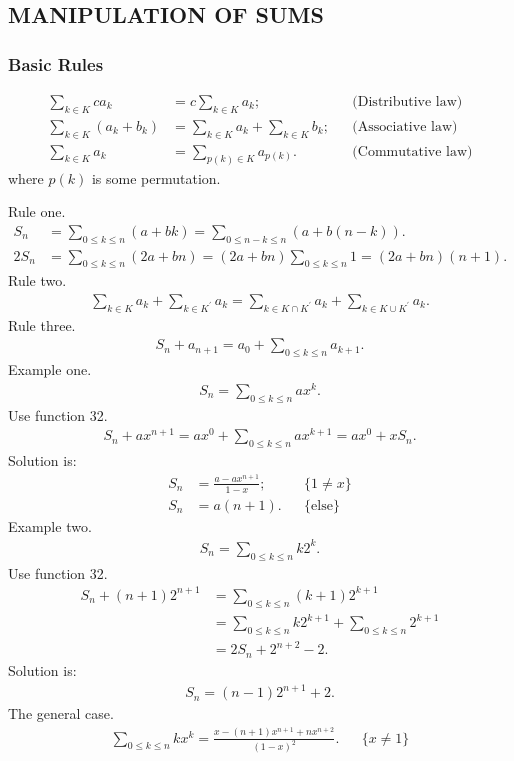 \documentclass{article}
\begin{document}
\subsection{MANIPULATION OF SUMS}
\subsubsection{Basic Rules}

\begin{align}
\sum_{k\in K} ca_k &= c\sum_{k\in K}a_k; && \text{(Distributive law)}\\
\sum_{k\in K} {(a_k+b_k)} &= \sum_{k\in K}a_k + \sum_{k\in K}b_k; && \text{(Associative law)}\\
\sum_{k\in K} a_k &= \sum_{p(k)\in K}a_{p(k)}. && \text{(Commutative law)}
\end{align}
where $p(k)$ is some permutation.


Rule one.
\begin{align}
S_n &= \sum_{0\le k \le n}{(a+bk)} = \sum_{0\le n - k \le n}{(a+b(n-k))}.\\
2S_n &= \sum_{0 \le k \le n} {(2a+bn)} = (2a+bn) \sum_{0 \le k \le n} {1} = (2a+bn)(n+1).
\end{align}
Rule two.
\begin{align}
\sum_{k\in K}{a_k} + \sum_{k\in K^\prime}{a_k} = \sum_{k\in K \cap K^\prime}{a_k} + \sum_{k\in K \cup K^\prime}{a_k}.
\end{align}
Rule three.
\begin{align}
S_n + a_{n+1} = a_0 + \sum_{0\le k \le n}{a_{k+1}}.
\end{align}
Example one.
\begin{align}
S_n = \sum_{0\le k \le n}{ax^k}.
\end{align}
Use function 32.
\begin{align}
S_n + ax^{n+1} = ax^0 + \sum_{0\le k \le n}ax^{k+1} = ax^0 + xS_n.
\end{align}
Solution is:
\begin{align}
S_n &= \frac{a - ax^{n+1}}{1-x}; && \{1\neq x\}\\
S_n &= a(n+1). && \{\text{else}\}
\end{align}
Example two.
\begin{align}
S_n = \sum_{0\le k \le n}{k2^k}.
\end{align}
Use function 32.
\begin{align}
S_n + (n+1)2^{n+1} & = \sum_{0\le k \le n}(k+1)2^{k+1} \\
		   & = \sum_{0\le k \le n}k2^{k+1} + \sum_{0\le k \le n}2^{k+1}\\
		   & = 2S_n + 2^{n+2} - 2.
\end{align}
Solution is:
\begin{align}
S_n = (n-1)2^{n+1} + 2.
\end{align}
The general case.
\begin{align}
\sum_{0\le k \le n}{kx^k} = \frac{x - (n+1)x^{n+1}+nx^{n+2}}{(1-x)^2}. && \{x \neq 1\}
\end{align}
\end{document}
